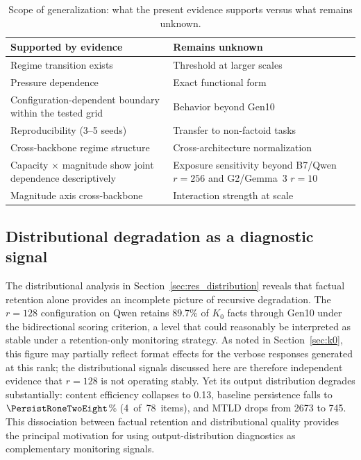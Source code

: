 \documentclass[a4paper,fleqn]{cas-dc}
\newif\ifshowchanges
\newcommand{\rev}[1]{\ifshowchanges{\color{blue}#1}\else{#1}\fi}
\renewcommand{\arraystretch}{1.8}
\begin{document}
\begin{table}[pos=htbp]
\caption{Scope of generalization: what the present evidence supports versus
what remains unknown.}\label{tab:generalization}
\footnotesize
\renewcommand{\arraystretch}{1.4}
\begin{tabular}{@{}p{3.6cm}p{3.6cm}@{}}
\toprule
\textbf{Supported by evidence} & \textbf{Remains unknown} \\
\midrule
Regime transition exists & Threshold at larger scales \\
\addlinespace
Pressure dependence & Exact functional form \\
\addlinespace
\rev{Configuration-dependent boundary within the tested grid} & Behavior beyond Gen10 \\
\addlinespace
Reproducibility (3--5 seeds) & Transfer to non-factoid tasks \\
\addlinespace
Cross-backbone regime structure & Cross-architecture normalization \\
\addlinespace
Capacity $\times$ magnitude \rev{show joint dependence descriptively} & \rev{Exposure sensitivity beyond B7/Qwen $r=256$ and G2/Gemma~3 $r=10$} \\
\addlinespace
Magnitude axis cross-backbone & Interaction strength at scale \\
\bottomrule
\end{tabular}
\end{table}

\subsection{Distributional degradation as a diagnostic signal}\label{sec:disc_drift}

The distributional analysis in Section~\ref{sec:res_distribution} reveals that
factual retention alone provides an incomplete picture of recursive degradation.
The $r=128$ configuration on Qwen retains 89.7\% of $K_0$ facts through Gen10
under the bidirectional scoring criterion,
a level that could reasonably be interpreted as stable under a retention-only
monitoring strategy. As noted in Section~\ref{sec:k0}, this figure may
partially reflect format effects for the verbose responses generated at this
rank; the distributional signals discussed here are therefore independent
evidence that $r=128$ is not operating stably. Yet its output distribution degrades substantially: content
efficiency collapses to 0.13, baseline persistence falls to \rev{$\PersistRoneTwoEight$\% (4~of~78~items)}, and MTLD
drops from 2673 to 745. This dissociation between factual retention and
distributional quality provides the principal motivation for using
output-distribution diagnostics as complementary monitoring signals.
\end{document}
